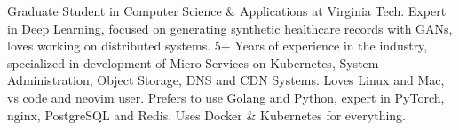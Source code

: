 

\begin{cvparagraph}


Graduate Student in Computer Science \& Applications at Virginia Tech. Expert in Deep Learning, focused on generating synthetic healthcare records with GANs, loves working on distributed systems. 5+ Years of experience in the industry, specialized in development of Micro-Services on Kubernetes, System Administration, Object Storage, DNS and CDN Systems. Loves Linux and Mac, vs code and neovim user. Prefers to use Golang and Python, expert in PyTorch, nginx, PostgreSQL and Redis. Uses Docker \& Kubernetes for everything.

\end{cvparagraph}
